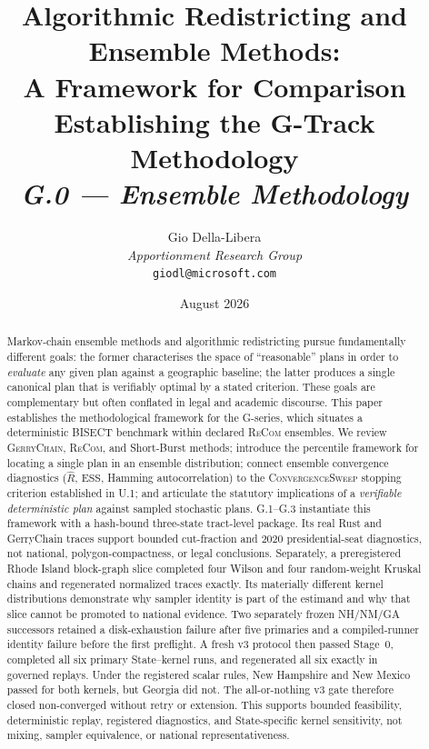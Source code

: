 \documentclass[12pt]{article}
\title{%
  \textbf{Algorithmic Redistricting and Ensemble Methods:\\
          A Framework for Comparison}\\[0.4em]
  \large Establishing the G-Track Methodology\\[0.8em]
  \normalsize\textit{G.0 --- Ensemble Methodology}%
}
\author{%
  Gio Della-Libera\\
  \textit{Apportionment Research Group}\\
  \small\texttt{giodl@microsoft.com}
}
\date{August 2026}
\newcommand{\gc}{\textsc{GerryChain}}
\newcommand{\recom}{\textsc{ReCom}}
\newcommand{\cs}{\textsc{ConvergenceSweep}}
\newcommand{\rhat}{\ensuremath{\hat{R}}}
\newcommand{\ess}{\ensuremath{\mathrm{ESS}}}
\begin{document}
\maketitle

\begin{abstract}
\noindent
Markov-chain ensemble methods and algorithmic redistricting pursue fundamentally
different goals: the former characterises the space of ``reasonable'' plans in
order to \emph{evaluate} any given plan against a geographic baseline; the
latter produces a single canonical plan that is verifiably optimal by a stated
criterion.  These goals are complementary but often conflated in legal and
academic discourse.  This paper establishes the methodological framework for
the G-series, which situates a deterministic BISECT benchmark within declared
\recom{} ensembles.  We review \gc{}, \recom{}, and Short-Burst methods; introduce
the percentile framework for locating a single plan in an ensemble
distribution; connect ensemble convergence diagnostics ($\rhat$, \ess{},
Hamming autocorrelation) to the \cs{} stopping criterion established in U.1;
and articulate the statutory implications of a \emph{verifiable deterministic
plan} against sampled stochastic plans.  G.1--G.3 instantiate this framework
with a hash-bound three-state tract-level package.  Its real Rust and
GerryChain traces support bounded cut-fraction and 2020 presidential-seat
diagnostics, not national, polygon-compactness, or legal conclusions.
Separately, a preregistered Rhode Island block-graph slice completed four
Wilson and four random-weight Kruskal chains and regenerated normalized traces
exactly.  Its materially different kernel distributions demonstrate why
sampler identity is part of the estimand and why that slice cannot be promoted
to national evidence.  Two separately frozen NH/NM/GA successors retained a
disk-exhaustion failure after five primaries and a compiled-runner identity
failure before the first preflight.  A fresh v3 protocol then passed Stage~0,
completed all six primary State--kernel runs, and regenerated all six exactly
in governed replays.  Under the registered scalar rules, New Hampshire and New
Mexico passed for both kernels, but Georgia did not.  The all-or-nothing v3
gate therefore closed non-converged without retry or extension.  This supports
bounded feasibility, deterministic replay, registered diagnostics, and
State-specific kernel sensitivity, not mixing, sampler equivalence, or
national representativeness.
\end{abstract}

\tableofcontents
\newpage











\end{document}
